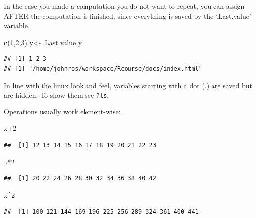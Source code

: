 \documentclass[]{book}
\newenvironment{Shaded}{\begin{snugshade}}{\end{snugshade}}
\newcommand{\KeywordTok}[1]{\textcolor[rgb]{0.13,0.29,0.53}{\textbf{{#1}}}}
\newcommand{\DecValTok}[1]{\textcolor[rgb]{0.00,0.00,0.81}{{#1}}}
\newcommand{\StringTok}[1]{\textcolor[rgb]{0.31,0.60,0.02}{{#1}}}
\newcommand{\NormalTok}[1]{{#1}}
\theoremstyle{definition}
\theoremstyle{definition}
\theoremstyle{remark}
\let\BeginKnitrBlock\begin \let\EndKnitrBlock\end
\begin{document}
In the case you made a computation you do not want to repeat, you can
assign AFTER the computation is finished, since everything is saved by
the `.Last.value' variable.

\begin{Shaded}
\begin{Highlighting}[]
\KeywordTok{c}\NormalTok{(}\DecValTok{1}\NormalTok{,}\DecValTok{2}\NormalTok{,}\DecValTok{3}\NormalTok{)}
\NormalTok{y<-}\StringTok{ }\NormalTok{.Last.value }
\NormalTok{y}
\end{Highlighting}
\end{Shaded}

\begin{verbatim}
## [1] 1 2 3
## [1] "/home/johnros/workspace/Rcourse/docs/index.html"
\end{verbatim}

\BeginKnitrBlock{remark}
In line with the linux look and feel, variables
starting with a dot (.) are saved but are hidden. To show them see
\texttt{?ls}.
\EndKnitrBlock{remark}

Operations usually work element-wise:

\begin{Shaded}
\begin{Highlighting}[]
\NormalTok{x}\DecValTok{+2}
\end{Highlighting}
\end{Shaded}

\begin{verbatim}
##  [1] 12 13 14 15 16 17 18 19 20 21 22 23
\end{verbatim}

\begin{Shaded}
\begin{Highlighting}[]
\NormalTok{x*}\DecValTok{2}    
\end{Highlighting}
\end{Shaded}

\begin{verbatim}
##  [1] 20 22 24 26 28 30 32 34 36 38 40 42
\end{verbatim}

\begin{Shaded}
\begin{Highlighting}[]
\NormalTok{x^}\DecValTok{2}    
\end{Highlighting}
\end{Shaded}

\begin{verbatim}
##  [1] 100 121 144 169 196 225 256 289 324 361 400 441
\end{verbatim}
\end{document}
